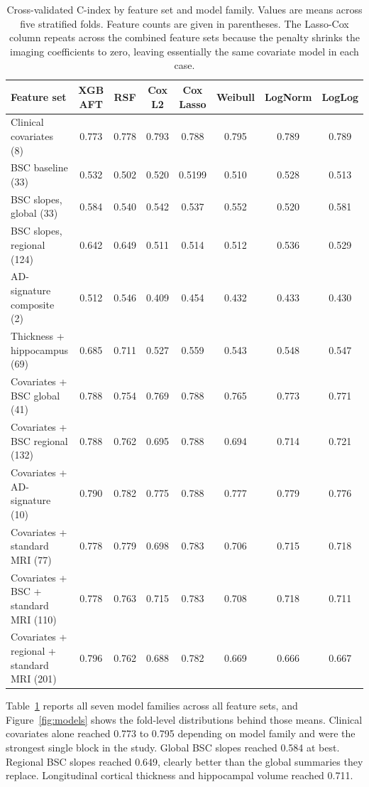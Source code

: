 \documentclass[blue]{ludusofficial}  %
\begin{document}
\begin{table}[t!]
\centering
\caption{Cross-validated C-index by feature set and model family. Values are means across five stratified folds. Feature counts are given in parentheses. The Lasso-Cox column repeats across the combined feature sets because the penalty shrinks the imaging coefficients to zero, leaving essentially the same covariate model in each case.}
\label{tab:model-performance}
\begin{tabular}{lccccccc}
\hline
\textbf{Feature set} & \textbf{XGB AFT} & \textbf{RSF} & \textbf{Cox L2} & \textbf{Cox Lasso} & \textbf{Weibull} & \textbf{LogNorm} & \textbf{LogLog} \\
\hline
Clinical covariates (8) & 0.773 & 0.778 & 0.793 & 0.788 & 0.795 & 0.789 & 0.789 \\
BSC baseline (33) & 0.532 & 0.502 & 0.520 & 0.5199 & 0.510 & 0.528 & 0.513 \\
BSC slopes, global (33) & 0.584 & 0.540 & 0.542 & 0.537 & 0.552 & 0.520 & 0.581 \\
BSC slopes, regional (124) & 0.642 & 0.649 & 0.511 & 0.514 & 0.512 & 0.536 & 0.529 \\
AD-signature composite (2) & 0.512 & 0.546 & 0.409 & 0.454 & 0.432 & 0.433 & 0.430 \\
Thickness + hippocampus (69) & 0.685 & 0.711 & 0.527 & 0.559 & 0.543 & 0.548 & 0.547 \\
\hline
Covariates + BSC global (41) & 0.788 & 0.754 & 0.769 & 0.788 & 0.765 & 0.773 & 0.771 \\
Covariates + BSC regional (132) & 0.788 & 0.762 & 0.695 & 0.788 & 0.694 & 0.714 & 0.721 \\
Covariates + AD-signature (10) & 0.790 & 0.782 & 0.775 & 0.788 & 0.777 & 0.779 & 0.776 \\
Covariates + standard MRI (77) & 0.778 & 0.779 & 0.698 & 0.783 & 0.706 & 0.715 & 0.718 \\
Covariates + BSC + standard MRI (110) & 0.778 & 0.763 & 0.715 & 0.783 & 0.708 & 0.718 & 0.711 \\
Covariates + regional + standard MRI (201) & 0.796 & 0.762 & 0.688 & 0.782 & 0.669 & 0.666 & 0.667 \\
\hline
\end{tabular}
\end{table}

Table~\ref{tab:model-performance} reports all seven model families across all feature sets, and Figure~\ref{fig:models} shows the fold-level distributions behind those means. Clinical covariates alone reached 0.773 to 0.795 depending on model family and were the strongest single block in the study. Global BSC slopes reached 0.584 at best. Regional BSC slopes reached 0.649, clearly better than the global summaries they replace. Longitudinal cortical thickness and hippocampal volume reached 0.711.
\end{document}
